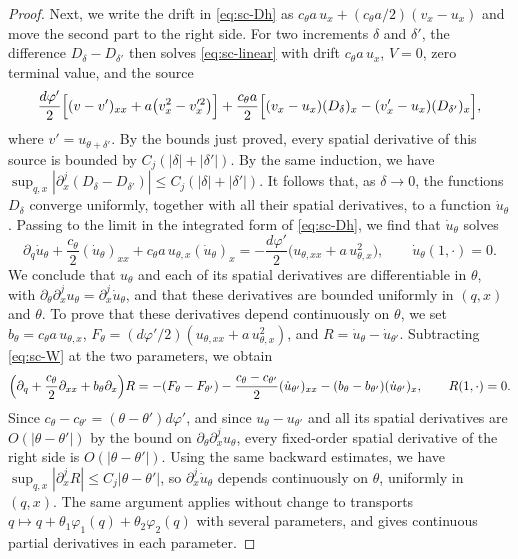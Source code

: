 \begin{proof}
Next, we write the drift in \eqref{eq:sc-Dh} as
$c_\theta a\,u_x+(c_\theta a/2)(v_x-u_x)$ and move the second part
to the right side. For two increments $\delta$ and $\delta'$, the
difference $D_\delta-D_{\delta'}$ then solves \eqref{eq:sc-linear} with
drift $c_\theta a\,u_x$, $V=0$, zero terminal value, and the source
\[
 \frac{d\varphi'}2\Bigl[(v-v')_{xx}+a\bigl(v_x^2-v_x'^2\bigr)\Bigr]
 +\frac{c_\theta a}2\Bigl[(v_x-u_x)(D_\delta)_x-(v'_x-u_x)(D_{\delta'})_x\Bigr],
\]
where $v'=u_{\theta+\delta'}$. By the bounds just proved, every spatial
derivative of this source is bounded by $C_j(|\delta|+|\delta'|)$. By
the same induction, we have
$\sup_{q,x}|\partial_x^j(D_\delta-D_{\delta'})|\le C_j(|\delta|+|\delta'|)$.
It follows that, as $\delta\to0$, the functions $D_\delta$ converge
uniformly, together with all their spatial derivatives, to a function
$\dot u_\theta$. Passing to the limit in the integrated form of
\eqref{eq:sc-Dh}, we find that $\dot u_\theta$ solves
\begin{equation}\label{eq:sc-W}
 \partial_q\dot u_\theta+\frac{c_\theta}2(\dot u_\theta)_{xx}
   +c_\theta a\,u_{\theta,x}(\dot u_\theta)_x
 =-\frac{d\varphi'}2\bigl(u_{\theta,xx}+a\,u_{\theta,x}^2\bigr),
 \qquad \dot u_\theta(1,\cdot)=0 .
\end{equation}
We conclude that $u_\theta$ and each of its spatial derivatives are
differentiable in $\theta$, with
$\partial_\theta\partial_x^ju_\theta=\partial_x^j\dot u_\theta$, and that
these derivatives are bounded uniformly in $(q,x)$ and $\theta$.
To prove that these derivatives depend continuously on $\theta$, we
set $b_\theta=c_\theta a\,u_{\theta,x}$,
$F_\theta=(d\varphi'/2)(u_{\theta,xx}+a\,u_{\theta,x}^2)$, and
$R=\dot u_\theta-\dot u_{\theta'}$. Subtracting \eqref{eq:sc-W} at the
two parameters, we obtain
\[
 \Bigl(\partial_q+\frac{c_\theta}2\partial_{xx}+b_\theta\partial_x\Bigr)R
 =-(F_\theta-F_{\theta'})
  -\frac{c_\theta-c_{\theta'}}2(\dot u_{\theta'})_{xx}
  -(b_\theta-b_{\theta'})(\dot u_{\theta'})_x,
 \qquad R(1,\cdot)=0 .
\]
Since $c_\theta-c_{\theta'}=(\theta-\theta')d\varphi'$, and since
$u_\theta-u_{\theta'}$ and all its spatial derivatives are
$O(|\theta-\theta'|)$ by the bound on $\partial_\theta\partial_x^ju_\theta$,
every fixed-order spatial derivative of the right side is
$O(|\theta-\theta'|)$. Using the same backward estimates, we have
$\sup_{q,x}|\partial_x^jR|\le C_j|\theta-\theta'|$, so
$\partial_x^j\dot u_\theta$ depends continuously on $\theta$, uniformly
in $(q,x)$. The same argument applies without
change to transports $q\mapsto q+\theta_1\varphi_1(q)+\theta_2\varphi_2(q)$
with several parameters, and gives continuous partial derivatives in
each parameter.


\end{proof}

